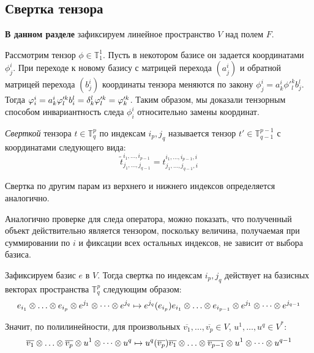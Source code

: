 \subsection{Свертка тензора}

\textbf{В данном разделе} зафиксируем линейное пространство $V$ над полем $F$.

\begin{example}
	Рассмотрим тензор $\phi \in \mathbb{T}^1_1$. Пусть в некотором базисе он задается координатами $\phi^i_j$. При переходе к новому базису с матрицей перехода $(a^i_j)$ и обратной матрицей перехода $(b^i_j)$ координаты тензора меняются по закону $\phi^i_j = a^i_k\phi'^k_l b^l_j$. Тогда $\phi^i_i = a^i_k\phi'^k_lb^l_i \hm{=} \delta^l_k\phi'^k_l = \phi'^k_k$. Таким образом, мы доказали тензорным способом инвариантность следа $\phi^i_i$ относительно замены координат.
\end{example}

\begin{definition}
	\textit{Сверткой} тензора $t \in \mathbb{T}^p_q$ по индексам $i_p, j_q$ называется тензор $t' \in \mathbb T^{p-1}_{q-1}$ с координатами следующего вида:
	\[\widetilde t^{i_1, \dots, i_{p-1}}_{j_1, \dots, j_{q-1}} = t^{i_1, \dots, i_{p - 1}, i}_{j_1, \dots, j_{q-1}, i}\]
	
	Свертка по другим парам из верхнего и нижнего индексов определяется аналогично.
\end{definition}

\begin{note}
	Аналогично проверке для следа оператора, можно показать, что полученный объект действительно является тензором, поскольку величина, получаемая при суммировании по $i$ и фиксации всех остальных индексов, не зависит от выбора базиса.
\end{note}

\begin{note}
	Зафиксируем базис $e$ в $V$. Тогда свертка по индексам $i_p, j_q$ действует на базисных векторах пространства $\mathbb T^p_q$ следующим образом:
	\[
	e_{i_1} \otimes \dots \hm{\otimes} e_{i_p} \otimes e^{j_1} \otimes \dots \otimes e^{j_q} \mapsto e^{j_q}(e_{i_p}) e_{i_1} \otimes \dots \hm{\otimes} e_{i_{p - 1}} \otimes e^{j_1} \otimes \dots \otimes e^{j_{q - 1}}
	\]
	
	Значит, по полилинейности, для произвольных $\overline{v_1}, \dotsc, \overline{v_p} \in V$, $u^1, \dotsc, u^q \in V^*$:
	\[\overline{v_1} \otimes \dots \hm{\otimes} \overline{v_p} \otimes u^1 \otimes \dots \otimes u^q \mapsto u^q(\overline{v_p}) \overline{v_{1}} \otimes \dots \hm{\otimes} \overline{v_{p - 1}} \otimes u^1 \otimes \dots \otimes u^{q - 1}\]
\end{note}

